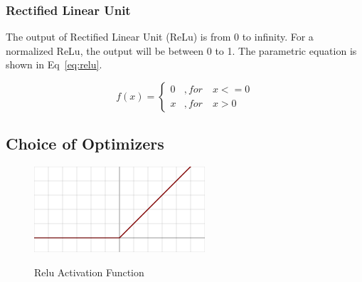  \subsubsection{Rectified Linear Unit}
  The output of Rectified Linear Unit (ReLu) is from 0 to infinity. For a normalized ReLu, the output will be between 0 to 1. The parametric equation is shown in Eq~\ref{eq:relu}.

  
  \begin{equation}
    f(x) = 
      \begin{cases}
        0 & ,for \quad x <= 0 \\
        x & ,for \quad x > 0
      \end{cases}
      \label{eq:relu}
  \end{equation}
  
  \subsection{Choice of Optimizers}

  


  \begin{figure}
    \centering
      \includegraphics[width=.45\textwidth]{mainmatter/3-Methodology/images/relu.png}
    \label{fig:relu}
    \caption{Relu Activation Function}
  \end{figure}

  \iffalse
